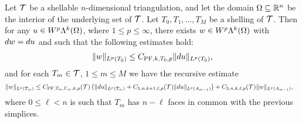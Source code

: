 \documentclass[10pt,a4paper]{article}
\begin{document}
\begin{theorem}\label{theorem:poincarefriedrichsestimate:exterior}
    Let ${\mathcal T}$ be a shellable $n$-dimensional triangulation, and let the domain $\Omega \subseteq {\mathbb R}^{n}$ be the interior of the underlying set of ${\mathcal T}$.
    Let $T_0, T_1, \dots, T_M$ be a shelling of ${\mathcal T}$.
    Then for any $u \in W^{p}\Lambda^{k}(\Omega)$, where $1 \leq p \leq \infty$, 
    there exists $w \in W^{p}\Lambda^{k}(\Omega)$ with $d w = d u$
    and such that the following estimates hold:
    \begin{gather*}
        \| w \|_{L^{p}(T_{0})} \leq C_{{{\rm PF}},k,T_{0},p} \| d u \|_{L^{p}(T_{0})}
        ,
    \end{gather*}
    and for each $T_{m} \in {\mathcal T}$, $1 \leq m \leq M$ we have the recursive estimate 
    \begin{align*}
        \| w \|_{L^{p}(T_{m})}
        &
        \leq  
        C_{{\rm PF},T_{m},\Gamma_{m},k,p}({\mathcal T}) 
        \left( 
            \| d u      \|_{L^{p}(T_{m})} 
            +
            C_{5,n,k+1,\ell,p}({\mathcal T})
            \| d u \|_{L^{p}(A_{m-1})}
        \right)
        + 
        C_{5,n,k,\ell,p}({\mathcal T})
        \| w \|_{L^{p}(A_{m-1})}
        ,
    \end{align*}
    where $0 \leq \ell < n$ is such that $T_{m}$ has $n - \ell$ faces in common with the previous simplices. 
\end{theorem}
\end{document}
